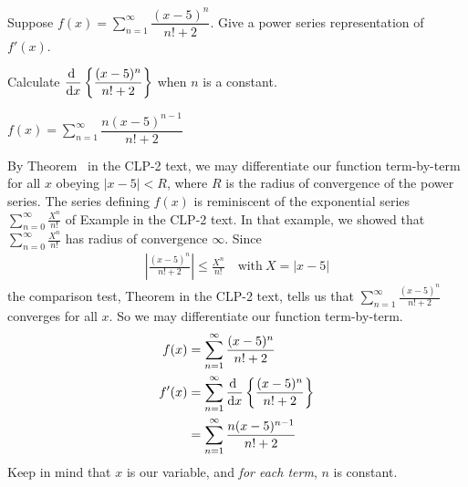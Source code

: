 \begin{Mquestion}
Suppose $f(x)=\displaystyle\sum_{n=1}^\infty \dfrac{(x-5)^n}{n!+2}$. Give a power series representation of $f'(x)$.
\end{Mquestion}
\begin{hint}
	Calculate $\displaystyle\diff{}{x}\left\{\frac{(x-5)^n}{n!+2}\right\}$ when $n$ is a constant.
\end{hint}
\begin{answer}
	$f(x)=\displaystyle\sum_{n=1}^\infty \dfrac{n(x-5)^{n-1}}{n!+2}$
\end{answer}
\begin{solution}
	By Theorem~ in the CLP-2 text, we may differentiate our function term-by-term for all $x$ obeying $|x-5|<R$, where $R$ is the radius of convergence of the power series. The series defining $f(x)$ is reminiscent of the exponential series 
$\sum_{n=0}^\infty \frac{X^n}{n!}$ of Example  in the CLP-2 text.
In that example, we showed that $\sum_{n=0}^\infty \frac{X^n}{n!}$ has radius of convergence $\infty$. Since
\begin{align*}
\left|\frac{(x-5)^n}{n!+2}\right|\le \frac{X^n}{n!}\quad\text{with}\  X=|x-5|
\end{align*}
the comparison test, Theorem  in the CLP-2 text, tells us
that $\sum_{n=1}^\infty \frac{(x-5)^n}{n!+2}$ converges for all $x$. So we may 
differentiate our function term-by-term.
	\begin{align*}
	f(x)&=\displaystyle\sum_{n=1}^\infty \dfrac{(x-5)^n}{n!+2}\\
	f'(x)&=\displaystyle\sum_{n=1}^\infty \diff{}{x}\left\{\dfrac{(x-5)^n}{n!+2}\right\}\\
	&=\sum_{n=1}^\infty \frac{n(x-5)^{n-1}}{n!+2}
		\end{align*}
	Keep in mind that $x$ is our variable, and \emph{for each term}, $n$ is constant.
\end{solution}

